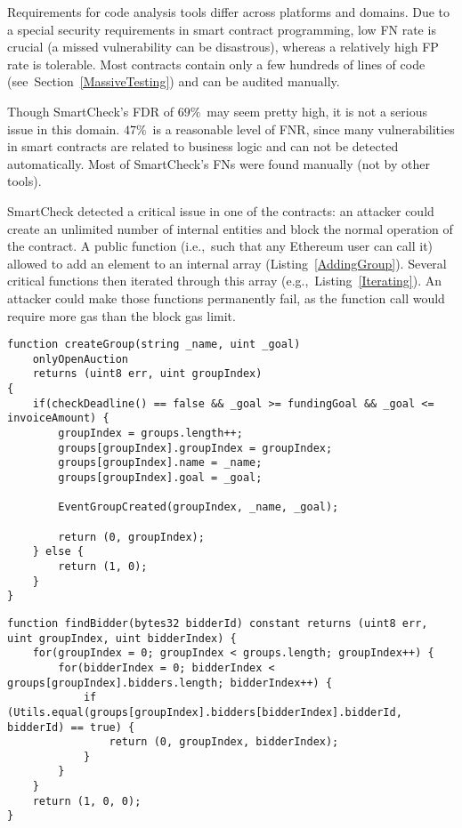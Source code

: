 Requirements for code analysis tools differ across platforms and domains.
Due to a special security requirements in smart contract programming, low FN rate is crucial (a missed vulnerability can be disastrous), whereas a relatively high FP rate is tolerable.
Most contracts contain only a few hundreds of lines of code (see~Section~\ref{MassiveTesting}) and can be audited manually.

Though SmartCheck's FDR of $69\%$~may seem pretty high, it is not a serious issue in this domain.
$47\%$~is a reasonable level of FNR, since many vulnerabilities in smart contracts are related to business logic and can not be detected automatically.
Most of SmartCheck's FNs were found manually (not by other tools).

SmartCheck detected a critical issue in one of the contracts: an attacker could create an unlimited number of internal entities and block the normal operation of the contract.
A public function (i.e.,~such that any Ethereum user can call it) allowed to add an element to an internal array (Listing~\ref{AddingGroup}).
Several critical functions then iterated through this array (e.g.,~Listing~\ref{Iterating}).
An attacker could make those functions permanently fail, as the function call would require more gas than the block gas limit.

\begin{minipage}{\linewidth} 
\begin{lstlisting}[caption={Adding an element to the internal array},label={AddingGroup},language=Solidity]
function createGroup(string _name, uint _goal)
    onlyOpenAuction
    returns (uint8 err, uint groupIndex)
{
	if(checkDeadline() == false && _goal >= fundingGoal && _goal <= invoiceAmount) {
		groupIndex = groups.length++;
		groups[groupIndex].groupIndex = groupIndex;
		groups[groupIndex].name = _name;
		groups[groupIndex].goal = _goal;

		EventGroupCreated(groupIndex, _name, _goal);

		return (0, groupIndex);
	} else {
		return (1, 0);
	}
}
\end{lstlisting}
\end{minipage}

\begin{minipage}{\linewidth}
\begin{lstlisting}[caption={Iterating through the internal array},label={Iterating},language=Solidity]
function findBidder(bytes32 bidderId) constant returns (uint8 err, uint groupIndex, uint bidderIndex) {
	for(groupIndex = 0; groupIndex < groups.length; groupIndex++) {
		for(bidderIndex = 0; bidderIndex < groups[groupIndex].bidders.length; bidderIndex++) {
			if (Utils.equal(groups[groupIndex].bidders[bidderIndex].bidderId, bidderId) == true) {
				return (0, groupIndex, bidderIndex);
			}
		}
	}
	return (1, 0, 0);
}
\end{lstlisting}
\end{minipage}

